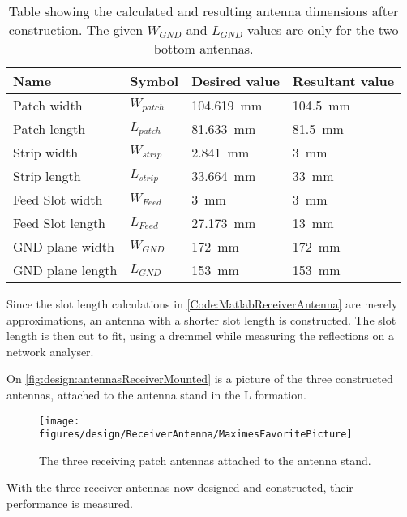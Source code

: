 \begin{table}[h!]
	\centering
	\caption{Table showing the calculated and resulting antenna dimensions after construction. The given $W_{GND}$ and $L_{GND}$ values are only for the two bottom antennas. }\label{tab:antennaDesign:antennaDimensions}
	\begin{tabular}{l l l l}
\textbf{Name}		& \textbf{Symbol} & \textbf{Desired value} 	& \textbf{Resultant value} 	\\ \toprule \rowcolor{lightGrey}
Patch width			& $W_{patch}$ & \SI{104.619}{\milli\meter}  	& \SI{104.5}{\milli\meter}		\\ 
Patch length		& $L_{patch}$ & \SI{81.633}{\milli\meter} 		& \SI{81.5}{\milli\meter} 		\\ \rowcolor{lightGrey}
Strip width			& $W_{strip}$  & \SI{2.841}{\milli\meter}  		& \SI{3}{\milli\meter} 		\\
Strip length		& $L_{strip}$  & \SI{33.664}{\milli\meter}  		& \SI{33}{\milli\meter} 		\\\rowcolor{lightGrey}
Feed Slot width			& $W_{Feed}$ 	& \SI{3}{\milli\meter}					& \SI{3}{\milli\meter}  		\\
Feed Slot length			& $L_{Feed}$ & \SI{27.173}{\milli\meter} 	& \SI{13}{\milli\meter} 		\\ \rowcolor{lightGrey}
GND plane width		& $W_{GND}$ 	& \SI{172}{\milli\meter} 						& \SI{172}{\milli\meter}  	\\ 
GND plane length	& $L_{GND}$ 	& \SI{153}{\milli\meter}						& \SI{153}{\milli\meter} 
	\end{tabular}
\end{table}

Since the slot length calculations in \autoref{Code:MatlabReceiverAntenna} are merely approximations, an antenna with a shorter slot length is constructed. The slot length is then cut to fit, using a dremmel while measuring the reflections on a network analyser.

On \autoref{fig:design:antennasReceiverMounted} is a picture of the three constructed antennas, attached to the antenna stand in the L formation.
\begin{figure}[h!]
\centering
\texttt{[image: figures/design/ReceiverAntenna/MaximesFavoritePicture]}
\caption{The three receiving patch antennas attached to the antenna stand.}\label{fig:design:antennasReceiverMounted}
\end{figure}

With the three receiver antennas now designed and constructed, their performance is measured.

